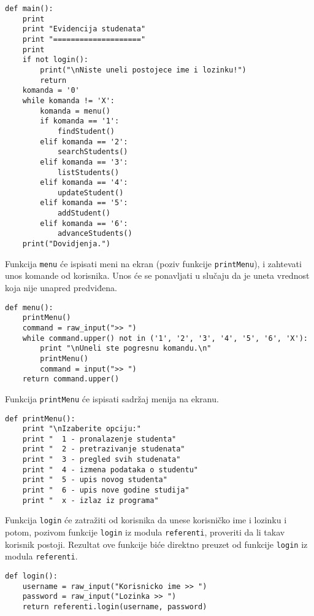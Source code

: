 \documentclass[a4paper]{article}
\begin{document}
\begin{verbatim}
def main():
    print
    print "Evidencija studenata"
    print "===================="
    print
    if not login():
        print("\nNiste uneli postojece ime i lozinku!")
        return
    komanda = '0'
    while komanda != 'X':
        komanda = menu()
        if komanda == '1':
            findStudent()
        elif komanda == '2':
            searchStudents()
        elif komanda == '3':
            listStudents()
        elif komanda == '4':
            updateStudent()
        elif komanda == '5':
            addStudent()
        elif komanda == '6':
            advanceStudents()
    print("Dovidjenja.")
\end{verbatim}

Funkcija \texttt{menu} će ispisati meni na ekran (poziv funkcije
\texttt{printMenu}), i zahtevati unos komande od korisnika. Unos će se
ponavljati u slučaju da je uneta vrednost koja nije unapred predviđena.

\begin{verbatim}
def menu():
    printMenu()
    command = raw_input(">> ")
    while command.upper() not in ('1', '2', '3', '4', '5', '6', 'X'):
        print "\nUneli ste pogresnu komandu.\n"
        printMenu()
        command = input(">> ")
    return command.upper()
\end{verbatim}

Funkcija \texttt{printMenu} će ispisati sadržaj menija na ekranu.

\begin{verbatim}
def printMenu():
    print "\nIzaberite opciju:"
    print "  1 - pronalazenje studenta"
    print "  2 - pretrazivanje studenata"
    print "  3 - pregled svih studenata"
    print "  4 - izmena podataka o studentu"
    print "  5 - upis novog studenta"
    print "  6 - upis nove godine studija"
    print "  x - izlaz iz programa"
\end{verbatim}

Funkcija \texttt{login} će zatražiti od korisnika da unese korisničko ime i
lozinku i potom, pozivom funkcije \texttt{login} iz modula \texttt{referenti},
proveriti da li takav korisnik postoji. Rezultat ove funkcije biće direktno
preuzet od funkcije \texttt{login} iz modula \texttt{referenti}.

\begin{verbatim}
def login():
    username = raw_input("Korisnicko ime >> ")
    password = raw_input("Lozinka >> ")
    return referenti.login(username, password)
\end{verbatim}
\end{document}
